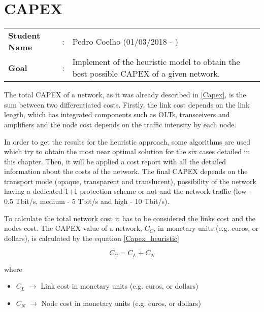 \clearpage

\section{CAPEX}\label{Heuristic_CAPEX}
\begin{tcolorbox}	
\begin{tabular}{p{2.75cm} p{0.2cm} p{10.5cm}} 	
\textbf{Student Name}  &:& Pedro Coelho    (01/03/2018 - )\\
\textbf{Goal}          &:& Implement of the heuristic model to obtain the best possible CAPEX of a given network.
\end{tabular}
\end{tcolorbox}
\vspace{11pt}

The total CAPEX of a network, as it was already described in \ref{Capex}, is the sum between two differentiated costs. Firstly, the link cost depends on the link length, which has integrated components such as OLTs, transceivers and amplifiers and the node cost depends on the traffic intensity by each node.

In order to get the results for the heuristic approach, some algorithms are used which try to obtain the most near optimal solution for the six cases detailed in this chapter. Then, it will be applied a cost report with all the detailed information about the costs of the network. The final CAPEX depends on the transport mode (opaque, transparent and translucent), possibility of the network having a dedicated 1+1 protection scheme or not and the network traffic (low - 0.5 Tbit/s, medium - 5 Tbit/s and high - 10 Tbit/s).

To calculate the total network cost it has to be considered the links cost and the nodes cost. The CAPEX value of a network, $C_C$, in monetary units (e.g. euros, or dollars), is calculated by the equation \ref{Capex_heuristic}

\begin{equation}
C_C = C_L + C_N
\label{Capex_heuristic}
\end{equation}

\noindent
where

\begin{itemize}
\item{$C_L$				$\rightarrow$	Link cost in monetary units (e.g. euros, or dollars)}
\item{$C_N$				$\rightarrow$	Node cost in monetary units (e.g. euros, or dollars)}
\end{itemize}

